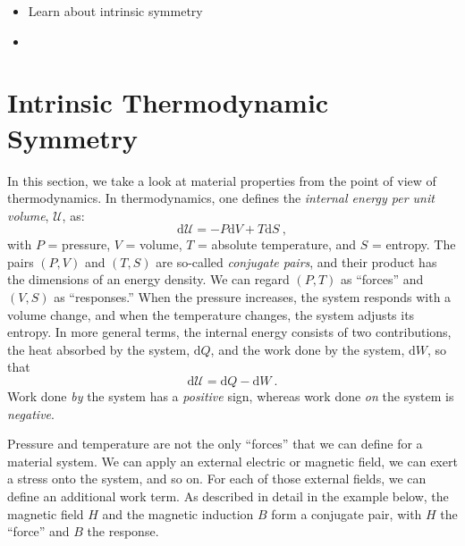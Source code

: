 \begin{learningobjectives}
{\begin{itemize}
    \item[{\color{OCBurntOrange}\ref{\chabbr:sec:thermosym}:}] Learn about intrinsic symmetry
    \item[{\color{OCBurntOrange}\ref{\chabbr:sec:thermosym}:}] 
     
\end{itemize}}
\end{learningobjectives}


\section{Intrinsic Thermodynamic Symmetry}\label{\chabbr:sec:thermosym}
In this section, we take a look at material properties from the point of view of thermodynamics.  In thermodynamics, one defines the \textit{internal energy per unit volume}, $\mathcal{U}$, as:
\begin{equation}
	\mathrm{d}\mathcal{U} = -P\mathrm{d}V+T\mathrm{d}S\ ,
\end{equation}
with $P$ = pressure, $V$ = volume, $T$ = absolute temperature, and $S$ = entropy.  The pairs $(P,V)$ and  $(T,S)$ are so-called \textit{conjugate pairs}, and their product has the dimensions of an energy density. We can regard $(P,T)$ as ``forces'' and $(V,S)$ as ``responses.''  When the pressure increases, the system responds with a volume change, and when the temperature changes, the system adjusts its entropy.  In more general terms, the internal energy consists of two contributions, the heat absorbed by the system, $\mathrm{d}Q$,  and the work done by the system, $\mathrm{d}W$, so that
\begin{equation}
	\mathrm{d}\mathcal{U} = \mathrm{d}Q-\mathrm{d}W\ .
\end{equation}
Work done \textit{by} the system has a \textit{positive} sign, whereas work done \textit{on} the system is \textit{negative}.

Pressure and temperature are not the only ``forces'' that we can define for a material system.  We can apply an external electric or magnetic field, we can exert a stress onto the system, and so on.  For each of those external fields, we can define an additional work term.  As described in detail in the example below, the magnetic field $H$ and the magnetic induction $B$ form a conjugate pair, with $H$ the ``force'' and $B$ the response.

